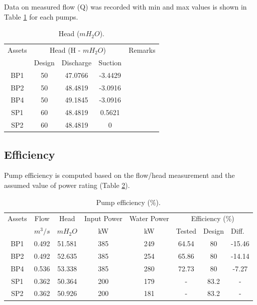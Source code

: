 Data on measured flow (Q) was recorded with min and max values is shown in Table \ref{ch04_tbl_flow02} for each pumps. %

\begin{table}[!h]
	\caption{Head ($mH_2O$).}
	\label{ch04_tbl_flow02}
	{\footnotesize
\begin{tabular}{c|c|c|c|l}
\hline
Assets & \multicolumn{3}{c|}{Head (H - $mH_2O$)} & Remarks \\ 
\cline{2-4}
 & Design & Discharge & Suction &  \\ 
\hline
BP1 & 50 & 47.0766 & -3.4429 &  \\ 
BP2 & 50 & 48.4819 & -3.0916 &  \\ 
BP4 & 50 & 49.1845 & -3.0916 &  \\ 
SP1 & 60 & 48.4819 & 0.5621 &  \\ 
SP2 & 60 & 48.4819 & 0 &  \\ 
\hline
\end{tabular}

	}
\end{table}


\subsection{Efficiency}

Pump efficiency is computed based on the flow/head measurement and the assumed value of power rating (Table \ref{ch05_tbl_efficiency}). 
\begin{table}[!h]
	\caption{Pump efficiency (\%).}
	\label{ch05_tbl_efficiency}
	{\footnotesize
\begin{tabular}{c|c|c|c|c|c|l|l}
	\hline
Assets & Flow & Head & Input Power & Water Power & \multicolumn{3}{c}{Efficiency (\%)} \\ 
\cline{6-8}
 & $m^3/s$ & $mH_2O$ & kW & kW & Tested & Design & Diff. \\ 
\hline
BP1 & 0.492 & 51.581 & 385 & 249 & 64.54 & \multicolumn{1}{c|}{80} & \multicolumn{1}{c}{-15.46} \\ 
BP2 & 0.492 & 52.635 & 385 & 254 & 65.86 & \multicolumn{1}{c|}{80} & \multicolumn{1}{c}{-14.14} \\ 
BP4 & 0.536 & 53.338 & 385 & 280 & 72.73 & \multicolumn{1}{c|}{80} & \multicolumn{1}{c}{-7.27} \\ 
SP1 & 0.362 & 50.364 & 200 & 179 & - & \multicolumn{1}{c|}{83.2} & \multicolumn{1}{c}{-} \\ 
SP2 & 0.362 & 50.926 & 200 & 181 & - & \multicolumn{1}{c|}{83.2} & \multicolumn{1}{c}{-} \\ 
\hline
\end{tabular}

	}
\end{table}

